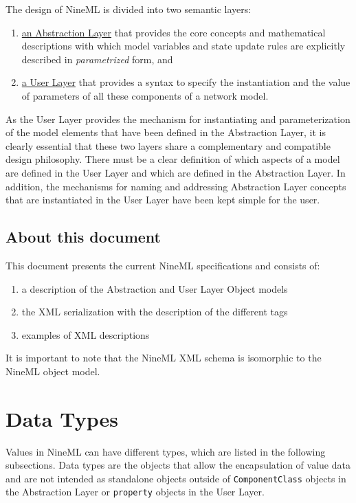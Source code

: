 \documentclass{article}
\begin{document}
The design of NineML is divided into two semantic layers: 
\begin {enumerate}
\item \underline {an Abstraction Layer} that provides the core concepts and mathematical descriptions with which
model variables and state update rules are explicitly described in {\em parametrized} form, and 
\item \underline {a User Layer} that provides a syntax to specify the instantiation and the value of parameters of all these components of a network model.
\end {enumerate}

As the User Layer provides the mechanism for instantiating and parameterization of the model elements that have been defined in the Abstraction Layer, it is clearly essential that these two layers share a complementary and compatible design philosophy. There must be a clear definition of which aspects of a model are defined in the User Layer and which are defined in the Abstraction Layer. 
In addition, the mechanisms for naming and addressing Abstraction Layer concepts that are instantiated in the User Layer have been kept simple for the user.

\subsection{About this document}

This document presents the current NineML specifications and consists of:
\begin{enumerate}
\item a description of the Abstraction and User Layer Object models
\item the XML serialization with the description of the different tags
\item examples of XML descriptions
\end{enumerate} 

It is important to note that the NineML XML schema is isomorphic to the NineML object model.

\section{Data Types}
\label{DataTypes}

Values in NineML can have different types, which are listed in the
following subsections. Data types are the objects that allow the
encapsulation of value data and are not intended as standalone
objects outside of {\tt ComponentClass} objects in the Abstraction
Layer or {\tt property} objects in the User Layer.
\end{document}
